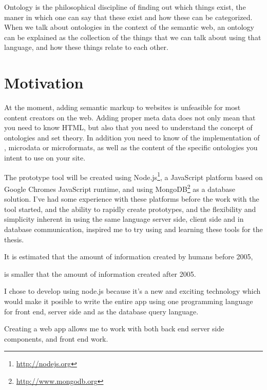 Ontology is the philosophical discipline of finding out which things exist,
the maner in which one can say that these exist and how these can be categorized.
When we talk about ontologies in the context of the semantic web,
an ontology can be explained as the collection of the things that we can talk about using that language,
and how these things relate to each other.


\section{Motivation}
At the moment, adding semantic markup to websites is unfeasible for most content creators on the web.
Adding proper meta data does not only mean that you need to know HTML,
but also that you need to understand the concept of ontologies and set theory.
In addition you need to know of the implementation of , microdata or microformats,
as well as the content of the specific ontologies you intent to use on your site.


The prototype tool will be created using Node.js\footnote{\url{http://nodejs.org}},
a JavaScript platform based on Google Chromes JavaScript runtime,
and using MongoDB\footnote{\url{http://www.mongodb.org}} as a database solution.
I've had some experience with these platforms before the work with the tool started,
and the ability to rapidly create prototypes, and the flexibility and simplicity inherent in using the same language
server side, client side and in database communication, inspired me to try using and learning these tools for the thesis.

It is estimated that the amount of information created by humans before 2005,

is smaller that the amount of information created after 2005.

I chose to develop using node.js because it's a new and exciting technology which would make it posible to write
the entire app using one programming language for front end, server side and as the database query language.

Creating a web app allows me to work with both back end server side components,
and front end work.


